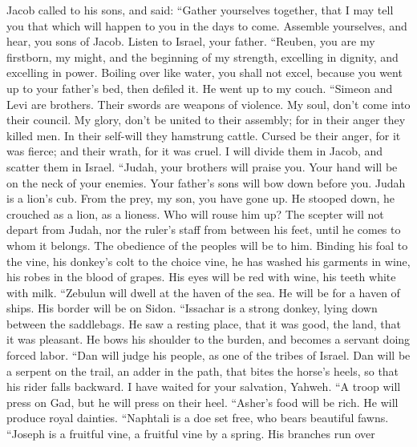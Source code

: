  Jacob called to his sons, and said: ``Gather yourselves
together, that I may tell you that which will happen to you in the days
to come.  Assemble yourselves, and hear, you sons of
Jacob. Listen to Israel, your father.  ``Reuben, you are
my firstborn, my might, and the beginning of my strength, excelling in
dignity, and excelling in power.  Boiling over like water,
you shall not excel, because you went up to your father's bed, then
defiled it. He went up to my couch.  ``Simeon and Levi are
brothers. Their swords are weapons of violence.  My soul,
don't come into their council. My glory, don't be united to their
assembly; for in their anger they killed men. In their self-will they
hamstrung cattle.  Cursed be their anger, for it was
fierce; and their wrath, for it was cruel. I will divide them in Jacob,
and scatter them in Israel.  ``Judah, your brothers will
praise you. Your hand will be on the neck of your enemies. Your father's
sons will bow down before you.  Judah is a lion's cub.
From the prey, my son, you have gone up. He stooped down, he crouched as
a lion, as a lioness. Who will rouse him up?  The scepter
will not depart from Judah, nor the ruler's staff from between his feet,
until he comes to whom it belongs. The obedience of the peoples will be
to him.  Binding his foal to the vine, his donkey's colt
to the choice vine, he has washed his garments in wine, his robes in the
blood of grapes.  His eyes will be red with wine, his
teeth white with milk.  ``Zebulun will dwell at the haven
of the sea. He will be for a haven of ships. His border will be on
Sidon.  ``Issachar is a strong donkey, lying down between
the saddlebags.  He saw a resting place, that it was
good, the land, that it was pleasant. He bows his shoulder to the
burden, and becomes a servant doing forced labor.  ``Dan
will judge his people, as one of the tribes of Israel. 
Dan will be a serpent on the trail, an adder in the path, that bites the
horse's heels, so that his rider falls backward.  I have
waited for your salvation, Yahweh.  ``A troop will press
on Gad, but he will press on their heel.  ``Asher's food
will be rich. He will produce royal dainties.  ``Naphtali
is a doe set free, who bears beautiful fawns.  ``Joseph
is a fruitful vine, a fruitful vine by a spring. His branches run over
